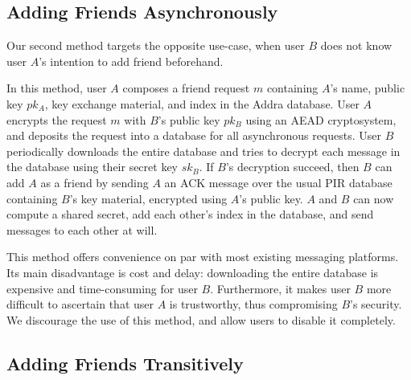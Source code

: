 \subsection{Adding Friends Asynchronously}
Our second method targets the opposite use-case, when user $B$ does not know user $A$'s intention to add friend beforehand. 

In this method, user $A$ composes a friend request $m$ containing $A$'s name, public key $pk_A$, key exchange material, and index in the Addra database. User $A$ encrypts the request $m$ with $B$'s public key $pk_B$ using an AEAD cryptosystem, and deposits the request into a database for all asynchronous requests. User $B$ periodically downloads the entire database and tries to decrypt each message in the database using their secret key $sk_B$. If $B$'s decryption succeed, then $B$ can add $A$ as a friend by sending $A$ an ACK message over the usual PIR database containing $B$'s key material, encrypted using $A$'s public key. $A$ and $B$ can now compute a shared secret, add each other's index in the database, and send messages to each other at will.

This method offers convenience on par with most existing messaging platforms. Its main disadvantage is cost and delay: downloading the entire database is expensive and time-consuming for user $B$. Furthermore, it makes user $B$ more difficult to ascertain that user $A$ is trustworthy, thus compromising $B$'s security. We discourage the use of this method, and allow users to disable it completely. 

\subsection{Adding Friends Transitively}
